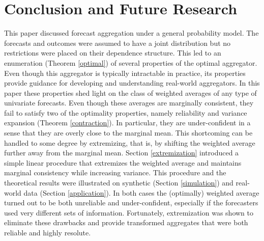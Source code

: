 \documentclass[11pt]{article}
\theoremstyle{definition}
\theoremstyle{definition}
\begin{document}

%
%
%

\section{Conclusion and Future Research} \label{conclusion}

This paper discussed forecast aggregation under a general probability model. The forecasts and outcomes were assumed to have a joint distribution but no restrictions were placed on their dependence structure. This led to an enumeration (Theorem \ref{optimal}) of several properties of the optimal aggregator. Even though this aggregator is typically intractable in practice, its properties provide guidance for developing and understanding real-world aggregators. In this paper these properties shed light on the class of weighted averages of any type of univariate forecasts. Even though these averages are marginally consistent, they fail to satisfy two of the optimality properties, namely reliability and variance expansion (Theorem \ref{contraction}). In particular, they are under-confident in a sense that they are overly close to the marginal mean. This shortcoming can be handled to some degree by extremizing, that is, by shifting the weighted average further away from the marginal mean.  Section \ref{extremization} introduced a simple linear procedure that extremizes the weighted average and maintains marginal consistency while increasing variance. This procedure and the theoretical results were illustrated on synthetic (Section \ref{simulation}) and real-world data (Section \ref{application}). In both cases the (optimally) weighted average turned out to be both unreliable and under-confident, especially if the forecasters used very different sets of information. Fortunately, extremization was shown to eliminate these drawbacks and provide transformed aggregates that were both reliable and highly resolute. 
\end{document}
